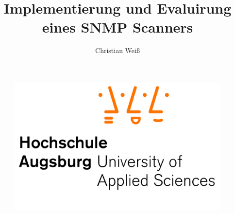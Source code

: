 \documentclass[11pt,a4paper]{article}
\author{Christian Weiß}
\title{Implementierung und Evaluirung eines SNMP Scanners}
\begin{document}
\newcommand{\emptyline}{\ \\}

\begin{figure}	%
	\centering
	\includegraphics[scale=.7]{Bilder/hsa.jpg}
	\label{img:logo}
\end{figure}
	
\vspace{\fill}
\end{document}
